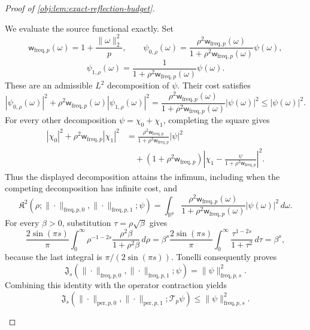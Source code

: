 \documentclass[11pt]{article}
\begin{document}
\begin{proof}[Proof of \cref{obj:lem:exact-reflection-budget}]
\begin{enumerate}
We evaluate the source functional exactly. Set
\[
\mathsf w_{\mathrm{freq},p}(\omega)
=
1+\frac{\|\omega\|_2^2}{p},
\qquad
\psi_{0,\rho}(\omega)
=
\frac{\rho^2\mathsf w_{\mathrm{freq},p}(\omega)}
{1+\rho^2\mathsf w_{\mathrm{freq},p}(\omega)}\psi(\omega),
\]
\[
\psi_{1,\rho}(\omega)
=
\frac{1}{1+\rho^2\mathsf w_{\mathrm{freq},p}(\omega)}\psi(\omega).
\]
These are an admissible \(L^2\) decomposition of \(\psi\). Their cost satisfies
\[
|\psi_{0,\rho}(\omega)|^2+
\rho^2\mathsf w_{\mathrm{freq},p}(\omega)
|\psi_{1,\rho}(\omega)|^2
=
\frac{\rho^2\mathsf w_{\mathrm{freq},p}(\omega)}
{1+\rho^2\mathsf w_{\mathrm{freq},p}(\omega)}
|\psi(\omega)|^2
\leq|\psi(\omega)|^2.
\]
For every other decomposition
\(\psi=\chi_0+\chi_1\), completing the square gives
\[
\begin{aligned}
|\chi_0|^2+\rho^2\mathsf w_{\mathrm{freq},p}|\chi_1|^2
&=
\frac{\rho^2\mathsf w_{\mathrm{freq},p}}
{1+\rho^2\mathsf w_{\mathrm{freq},p}}|\psi|^2\\
&\quad+
(1+\rho^2\mathsf w_{\mathrm{freq},p})
\left|
\chi_1-\frac{\psi}{1+\rho^2\mathsf w_{\mathrm{freq},p}}
\right|^2.
\end{aligned}
\]
Thus the displayed decomposition attains the infimum, including when the competing decomposition has infinite cost, and
\[
\mathfrak K^2\!\left(
\rho;
\|\cdot\|_{\mathrm{freq},p,0},
\|\cdot\|_{\mathrm{freq},p,1};
\psi
\right)
=
\int_{\mathbb R^p}
\frac{\rho^2\mathsf w_{\mathrm{freq},p}(\omega)}
{1+\rho^2\mathsf w_{\mathrm{freq},p}(\omega)}
|\psi(\omega)|^2\,d\omega.
\]
For every \(\beta>0\), substitution
\(\tau=\rho\sqrt{\beta}\) gives
\[
\frac{2\sin(\pi s)}{\pi}
\int_0^\infty
\rho^{-1-2s}\frac{\rho^2\beta}{1+\rho^2\beta}\,d\rho
=
\beta^s\frac{2\sin(\pi s)}{\pi}
\int_0^\infty\frac{\tau^{1-2s}}{1+\tau^2}\,d\tau
=
\beta^s,
\]
because the last integral is \(\pi/(2\sin(\pi s))\).
Tonelli consequently proves
\[
\mathfrak J_s\!\left(
\|\cdot\|_{\mathrm{freq},p,0},
\|\cdot\|_{\mathrm{freq},p,1};
\psi
\right)
=
\|\psi\|_{\mathrm{freq},p,s}^2.
\]
Combining this identity with the operator contraction yields
\[
\mathfrak J_s\!\left(
\|\cdot\|_{\mathrm{per},p,0},
\|\cdot\|_{\mathrm{per},p,1};
\mathscr T_p\psi
\right)
\leq
\|\psi\|_{\mathrm{freq},p,s}^2.
\]


\end{enumerate}
\end{proof}
\end{document}
